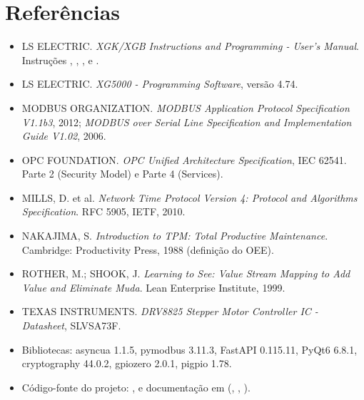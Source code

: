 \section{Referências}

\begin{itemize}
    \item LS ELECTRIC. \textit{XGK/XGB Instructions and Programming - User's Manual}. Instruções , , ,  e .
    \item LS ELECTRIC. \textit{XG5000 - Programming Software}, versão 4.74.
    \item MODBUS ORGANIZATION. \textit{MODBUS Application Protocol Specification V1.1b3}, 2012; \textit{MODBUS over Serial Line Specification and Implementation Guide V1.02}, 2006.
    \item OPC FOUNDATION. \textit{OPC Unified Architecture Specification}, IEC 62541. Parte 2 (Security Model) e Parte 4 (Services).
    \item MILLS, D. et al. \textit{Network Time Protocol Version 4: Protocol and Algorithms Specification}. RFC 5905, IETF, 2010.
    \item NAKAJIMA, S. \textit{Introduction to TPM: Total Productive Maintenance}. Cambridge: Productivity Press, 1988 (definição do OEE).
    \item ROTHER, M.; SHOOK, J. \textit{Learning to See: Value Stream Mapping to Add Value and Eliminate Muda}. Lean Enterprise Institute, 1999.
    \item TEXAS INSTRUMENTS. \textit{DRV8825 Stepper Motor Controller IC - Datasheet}, SLVSA73F.
    \item Bibliotecas: asyncua 1.1.5, pymodbus 3.11.3, FastAPI 0.115.11, PyQt6 6.8.1, cryptography 44.0.2, gpiozero 2.0.1, pigpio 1.78.
    \item Código-fonte do projeto: ,  e documentação em  (, , ).
\end{itemize}
\newpage
